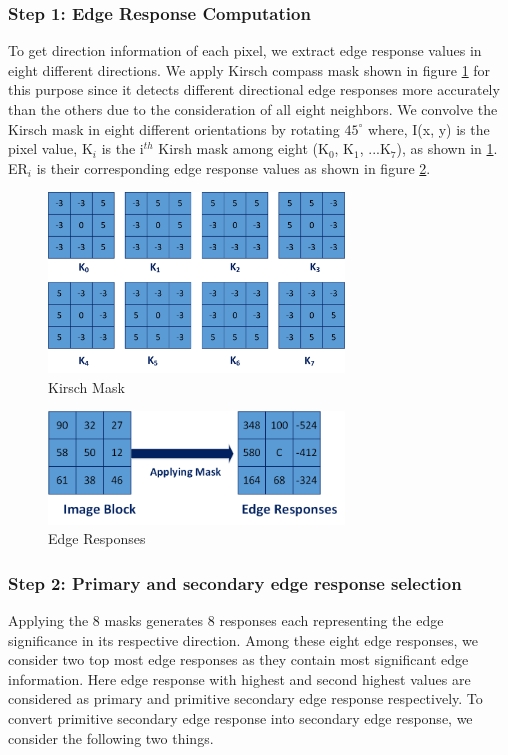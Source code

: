 \documentclass[12pt]{article}
\begin{document}
\subsubsection {Step 1: Edge Response Computation }
To get direction information of each pixel, we extract edge response values in eight different directions. We apply Kirsch compass mask shown in figure \ref{fig:KirschMask} for this purpose since it detects different directional edge responses more accurately than the others due to the consideration of all eight neighbors. We convolve the Kirsch mask in eight different orientations by rotating $45^\circ$
where, I(x, y) is the pixel value, K$_i$ is the i$^{th}$ Kirsh mask among eight (K$_0$, K$_1$, ...K$_7$), as shown in \ref{fig:KirschMask}. ER$_i$ is their corresponding edge response values as shown in figure \ref{fig:apply_mask}.
\begin{figure}[H]
	\begin{center}
		\centering
		\includegraphics[width=0.7\textwidth]{KirschMask.png}
		\caption{Kirsch Mask}
				\label{fig:KirschMask}	
	\end{center}
\end{figure}

\begin{figure}[H]
	\begin{center}
		\centering
		\includegraphics[width=0.7\textwidth]{apply_mask.png}
		\caption{Edge Responses}
				\label{fig:apply_mask}
	\end{center}
\end{figure}


\subsubsection{Step 2: Primary and secondary edge response selection} 	
Applying the 8 masks generates 8 responses each representing the edge significance in its respective direction. Among these eight edge responses, we consider two top most edge responses as they contain most significant edge information. Here edge response with highest and second highest values are considered as primary and primitive secondary edge response respectively. To convert primitive secondary edge response into secondary edge response, we consider the following two things.
\end{document}

